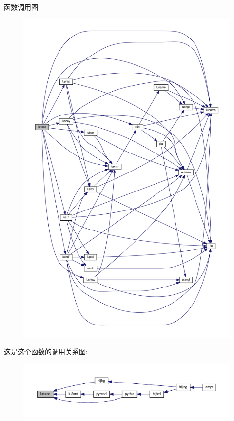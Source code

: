 函数调用图\+:
\nopagebreak
\begin{figure}[H]
\begin{center}
\leavevmode
\includegraphics[width=350pt]{luexec_8f90_a5b4b744833efbda90c865012826ff281_cgraph}
\end{center}
\end{figure}
这是这个函数的调用关系图\+:
\nopagebreak
\begin{figure}[H]
\begin{center}
\leavevmode
\includegraphics[width=350pt]{luexec_8f90_a5b4b744833efbda90c865012826ff281_icgraph}
\end{center}
\end{figure}
